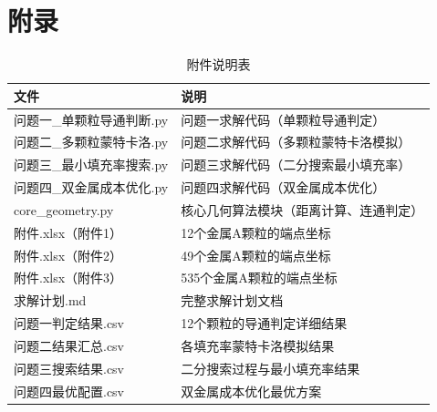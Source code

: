 
\makeatletter
\let\@oldaddcontentsline\addcontentsline
\renewcommand{\addcontentsline}[3]{}
\section*{附录}
\let\addcontentsline\@oldaddcontentsline
\makeatother

\begin{table}[H]
  \centering
  \caption{附件说明表}
  \label{tab:appendix}
  \renewcommand{\arraystretch}{1.2}
  \begin{tabularx}{\textwidth}{LX}
    \toprule
    文件 & 说明 \\
    \midrule
    问题一\_单颗粒导通判断.py & 问题一求解代码（单颗粒导通判定） \\
    问题二\_多颗粒蒙特卡洛.py & 问题二求解代码（多颗粒蒙特卡洛模拟） \\
    问题三\_最小填充率搜索.py & 问题三求解代码（二分搜索最小填充率） \\
    问题四\_双金属成本优化.py & 问题四求解代码（双金属成本优化） \\
    core\_geometry.py & 核心几何算法模块（距离计算、连通判定） \\
    附件.xlsx（附件1） & 12个金属A颗粒的端点坐标 \\
    附件.xlsx（附件2） & 49个金属A颗粒的端点坐标 \\
    附件.xlsx（附件3） & 535个金属A颗粒的端点坐标 \\
    求解计划.md & 完整求解计划文档 \\
    问题一判定结果.csv & 12个颗粒的导通判定详细结果 \\
    问题二结果汇总.csv & 各填充率蒙特卡洛模拟结果 \\
    问题三搜索结果.csv & 二分搜索过程与最小填充率结果 \\
    问题四最优配置.csv & 双金属成本优化最优方案 \\
    \bottomrule
  \end{tabularx}
\end{table}
